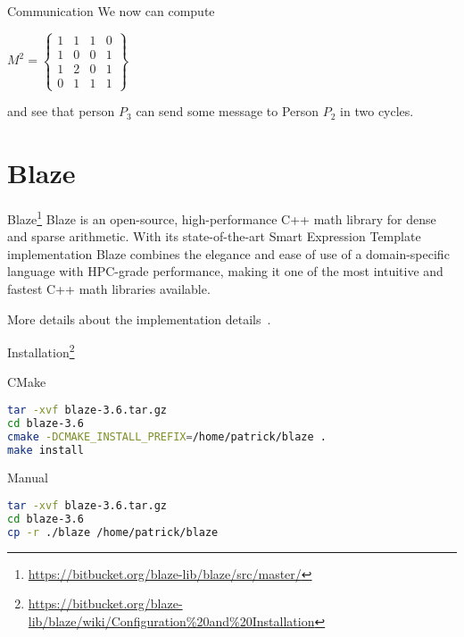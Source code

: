 \documentclass[12pt,t]{beamer}
\begin{document}
\begin{frame}{Communication}
We now can compute 

\begin{center}
$
M^2 = \left\lbrace\begin{matrix}
1 &  1 & 1 &  0 \\
1 & 0 & 0  & 1 \\
1 & 2 & 0 & 1 \\
0 & 1 & 1 & 1
\end{matrix} \right\rbrace
$
\end{center}
and see that person $P_3$ can send some message to Person $P_2$ in two cycles. 


\end{frame}


\section{Blaze}

\begin{frame}{Blaze\footnote{\tiny\url{https://bitbucket.org/blaze-lib/blaze/src/master/}}}
Blaze is an open-source, high-performance C++ math library for dense and sparse arithmetic. With its state-of-the-art Smart Expression Template implementation Blaze combines the elegance and ease of use of a domain-specific language with HPC-grade performance, making it one of the most intuitive and fastest C++ math libraries available.
\vspace{1cm}

More details about the implementation details~\cite{doi:10.1137/110830125,6266939}.
\end{frame}



\begin{frame}[fragile]{Installation\footnote{\tiny\url{https://bitbucket.org/blaze-lib/blaze/wiki/Configuration\%20and\%20Installation}}}


\begin{block}{CMake}
\begin{lstlisting}[language=bash]
tar -xvf blaze-3.6.tar.gz
cd blaze-3.6
cmake -DCMAKE_INSTALL_PREFIX=/home/patrick/blaze .
make install
\end{lstlisting}
\end{block}

\begin{block}{Manual}
\begin{lstlisting}[language=bash]
tar -xvf blaze-3.6.tar.gz
cd blaze-3.6
cp -r ./blaze /home/patrick/blaze
\end{lstlisting}
\end{block}


\end{frame}
\end{document}
